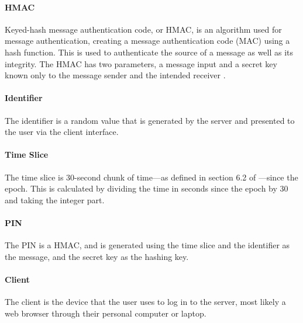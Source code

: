\documentclass[11pt]{article}
\begin{document}
\paragraph{HMAC} Keyed-hash message authentication code, or HMAC, is an
algorithm used for message authentication, creating a message
authentication code (MAC) using a hash function. This is used to
authenticate the source of a message as well as its integrity. The HMAC
has two parameters, a message input and a secret key known only to the
message sender and the intended receiver \cite{FIPS198}.

\paragraph{Identifier} The identifier is a random value that is
generated by the server and presented to the user via the client
interface. 

\paragraph{Time Slice} The time slice is 30-second chunk of time---as
defined in section 6.2 of \cite{shirvanian2d2fa}---since the epoch. This
is calculated by dividing the time in seconds since the epoch by 30 and
taking the integer part. 

\paragraph{PIN} The PIN is a HMAC, and is generated using the time slice
and the identifier as the message, and the secret key as the hashing
key. 

\paragraph{Client} The client is the device that the user uses to log in
to the server, most likely a web browser through their personal computer
or laptop. 
\end{document}
